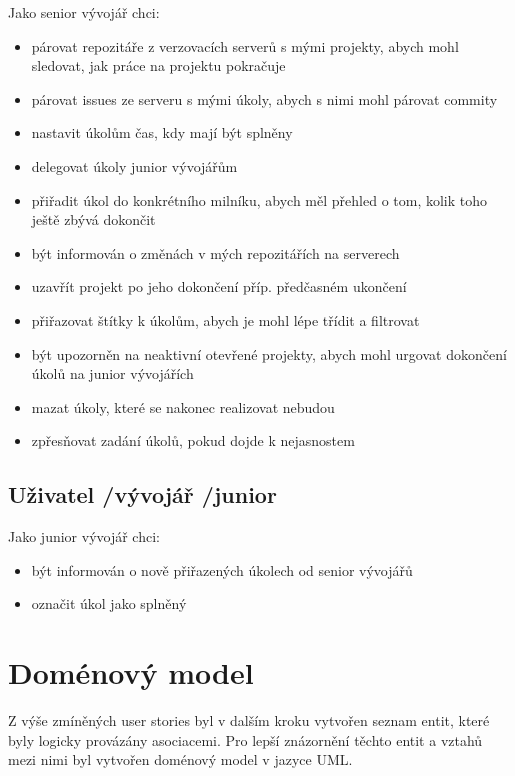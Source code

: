 Jako senior vývojář chci: 

\begin{itemize}
\item párovat repozitáře z verzovacích serverů s mými projekty, abych mohl sledovat, jak práce na projektu pokračuje
\item párovat issues ze serveru s mými úkoly, abych s nimi mohl párovat commity
\item nastavit úkolům čas, kdy mají být splněny
\item delegovat úkoly junior vývojářům
\item přiřadit úkol do konkrétního milníku, abych měl přehled o tom, kolik toho ještě zbývá dokončit
\item být informován o změnách v mých repozitářích na serverech
\item uzavřít projekt po jeho dokončení příp. předčasném ukončení
\item přiřazovat štítky k úkolům, abych je mohl lépe třídit a filtrovat
\item být upozorněn na neaktivní otevřené projekty, abych mohl urgovat dokončení úkolů na junior vývojářích
\item mazat úkoly, které se nakonec realizovat nebudou
\item zpřesňovat zadání úkolů, pokud dojde k nejasnostem
\end{itemize}

\subsection{Uživatel \slash  vývojář \slash  junior}

Jako junior vývojář chci:

\begin{itemize}
\item být informován o nově přiřazených úkolech od senior vývojářů
\item označit úkol jako splněný
\end{itemize}

\section{Doménový model}
Z výše zmíněných user stories byl v dalším kroku vytvořen seznam entit, které byly logicky provázány asociacemi. Pro lepší znázornění těchto entit a vztahů mezi nimi byl vytvořen doménový model v jazyce UML.

